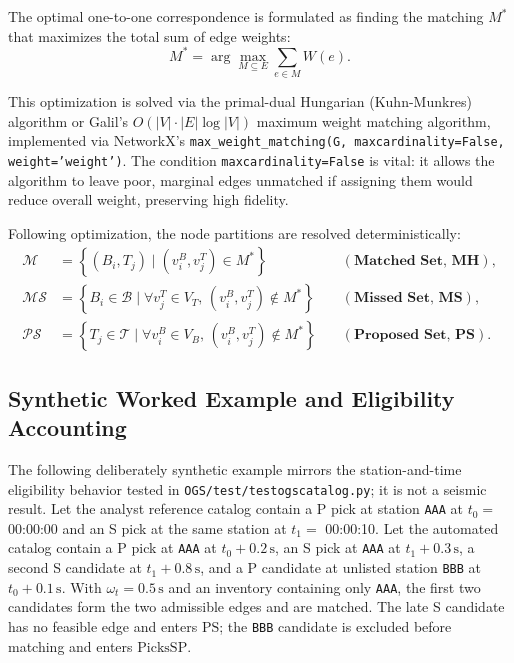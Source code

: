 The optimal one-to-one correspondence is formulated as finding the matching $M^*$ that maximizes the total sum of edge weights:
\begin{equation}
  M^* = \arg\max_{M \subseteq E} \sum_{e \in M} W(e).
\end{equation}

This optimization is solved via the primal-dual Hungarian (Kuhn-Munkres) algorithm or Galil's $O(|V| \cdot |E| \log |V|)$ maximum weight matching algorithm, implemented via NetworkX's \texttt{max\_weight\_matching(G, maxcardinality=False, weight='weight')}. The condition \texttt{maxcardinality=False} is vital: it allows the algorithm to leave poor, marginal edges unmatched if assigning them would reduce overall weight, preserving high fidelity.

Following optimization, the node partitions are resolved deterministically:
\begin{align}
  \mathcal{M} &= \left\{ (B_i, T_j) \mid (v_i^B, v_j^T) \in M^* \right\} \quad &(\textbf{Matched Set, MH}), \\
  \mathcal{MS} &= \left\{ B_i \in \mathcal{B} \mid \forall v_j^T \in V_T, \, (v_i^B, v_j^T) \notin M^* \right\} \quad &(\textbf{Missed Set, MS}), \\
  \mathcal{PS} &= \left\{ T_j \in \mathcal{T} \mid \forall v_i^B \in V_B, \, (v_i^B, v_j^T) \notin M^* \right\} \quad &(\textbf{Proposed Set, PS}).
\end{align}

\subsection{Synthetic Worked Example and Eligibility Accounting}
\label{subsec:bgma_worked_example}
The following deliberately synthetic example mirrors the station-and-time eligibility behavior tested in \texttt{OGS/test/testogscatalog.py}; it is not a seismic result. Let the analyst reference catalog contain a P pick at station \texttt{AAA} at $t_0=$ 00:00:00 and an S pick at the same station at $t_1=$ 00:00:10. Let the automated catalog contain a P pick at \texttt{AAA} at $t_0+0.2\,\unit{\second}$, an S pick at \texttt{AAA} at $t_1+0.3\,\unit{\second}$, a second S candidate at $t_1+0.8\,\unit{\second}$, and a P candidate at unlisted station \texttt{BBB} at $t_0+0.1\,\unit{\second}$. With $\omega_t=0.5\,\unit{\second}$ and an inventory containing only \texttt{AAA}, the first two candidates form the two admissible edges and are matched. The late S candidate has no feasible edge and enters $\mathrm{PS}$; the \texttt{BBB} candidate is excluded before matching and enters $\mathrm{PicksSP}$.

